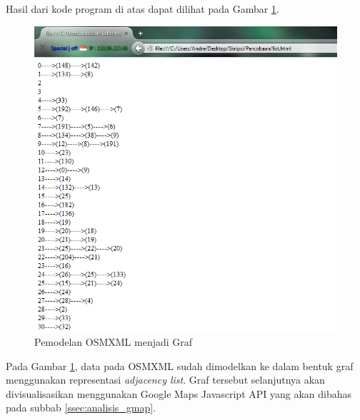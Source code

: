 Hasil dari kode program di atas dapat dilihat pada Gambar
\ref{fig:graf_analisis}.
\begin{figure}[h]
\centering
\includegraphics[scale=0.5]{Gambar/graf_analisis}
\caption[Pemodelan OSMXML menjadi Graf]{Pemodelan OSMXML menjadi Graf}
\label{fig:graf_analisis}
\end{figure}
Pada Gambar \ref{fig:graf_analisis}, data pada OSMXML sudah dimodelkan ke dalam
bentuk graf menggunakan representasi \textit{adjacency list}. Graf tersebut
selanjutnya akan divisualisasikan menggunakan Google Maps Javascript API yang
akan dibahas pada subbab \ref{ssec:analisis_gmap}.

